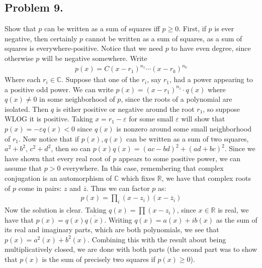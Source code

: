 \documentclass[12pt]{article}
\theoremstyle{definitionstyle}
\def\mbb#1{\mathbb{#1}}
\def\C{\mbb{C}}
\def\R{\mbb{R}}
\def\ve{\varepsilon}
\begin{document}
    \subsection*{Problem 9.}
    Show that $p$ can be written as a sum of squares iff $p \geq 0$. First, if $p$ is ever negative, then certainly $p$ cannot be written as a sum of squares, as a sum of squares is everywhere-positive. Notice that we need $p$ to have even degree, since otherwise $p$ will be negative somewhere. Write
    \begin{align*}
        p(x) = C(x-r_1)^{n_1} \cdots (x-r_k)^{n_k}
    \end{align*}
    Where each $r_i \in \C$. Suppose that one of the $r_i$, say $r_1$, had a power appearing to a positive odd power. We can write $p(x) = (x-r_1)^{n_1} \cdot q(x)$ where $q(x) \neq 0$ in some neighborhood of $p$, since the roots of a polynomial are isolated. Then $q$ is either positive or negative around the root $r_1$, so suppose WLOG it is positive. Taking $x = r_1-\ve$ for some small $\ve$ will show that $p(x) = -\ve q(x) < 0$ since $q(x)$ is nonzero around some small neighborhood of $r_1$. Now notice that if $p(x), q(x)$ can be written as a sum of two squares, $a^2+b^2$, $c^2+d^2$, then so can $p(x)q(x) = (ac-bd)^2 + (ad+bc)^2$. Since we have shown that every real root of $p$ appears to some positive power, we can assume that $p > 0$ everywhere. In this case, remembering that complex conjugation is an automorphism of $\C$ which fixes $\R$, we have that complex roots of $p$ come in pairs: $z$ and $\overline z$. Thus we can factor $p$ as:
    \begin{align*}
        p(x) = \prod_i (x-z_i)(x-\overline z_i)
    \end{align*}
    Now the solution is clear. Taking $q(x) = \prod (x-z_i)$, since $x \in \R$ is real, we have that $p(x) = q(x)\overline{q(x)}$. Writing $q(x) = a(x) + ib(x)$ as the sum of its real and imaginary parts, which are both polynomials, we see that $p(x) = a^2(x) + b^2(x)$. Combining this with the result about being multiplicatively closed, we are done with both parts (the second part was to show that $p(x)$ is the sum of precisely two squares if $p(x) \geq 0$).
\end{document}
